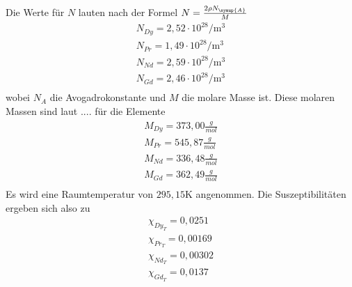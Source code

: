 Die Werte für $N$ lauten nach der Formel $N=\frac{2 \rho N_{\symup{A}}}{M}$
\begin{align*}
  N_{Dy} = 2,52 \cdot 10^{28} \si{\per\meter^3}\\
  N_{Pr} = 1,49 \cdot 10^{28} \si{\per\meter^3}\\
  N_{Nd} = 2,59 \cdot 10^{28} \si{\per\meter^3}\\
  N_{Gd} = 2,46 \cdot 10^{28} \si{\per\meter^3}\\
 \end{align*}
wobei $N_A$ die Avogadrokonstante und $M$ die molare Masse ist.
Diese molaren Massen sind laut .... für die Elemente
\begin{align*}
  M_{Dy} = 373,00 \frac{g}{mol} \\
  M_{Pr} = 545,87 \frac{g}{mol} \\
  M_{Nd} = 336,48 \frac{g}{mol} \\
  M_{Gd} = 362,49 \frac{g}{mol} \\
\end{align*}
Es wird eine Raumtemperatur von $295,15 \si{\kelvin}$ angenommen.
Die Suszeptibilitäten ergeben sich also zu
\begin{align*}
\chi_{Dy_T} = 0,0251 \\
\chi_{Pr_T} = 0,00169 \\
\chi_{Nd_T} = 0,00302 \\
\chi_{Gd_T} = 0,0137 \\
\end{align*}
